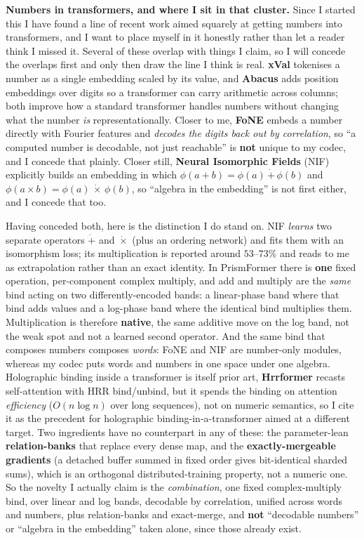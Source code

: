 \documentclass[11pt]{article}
\begin{document}
\textbf{Numbers in transformers, and where I sit in that cluster.} Since I started this I have found a
line of recent work aimed squarely at getting numbers into transformers, and I want to place myself in
it honestly rather than let a reader think I missed it. Several of these overlap with things I claim, so
I will concede the overlaps first and only then draw the line I think is real. \textbf{xVal}
\parencite{golkar2023xval} tokenises a number as a single embedding scaled by its value, and \textbf{Abacus}
\parencite{mcleish2024abacus} adds position embeddings over digits so a transformer can carry arithmetic
across columns; both improve how a standard transformer handles numbers without changing what the number
\emph{is} representationally. Closer to me, \textbf{FoNE} \parencite{zhou2025fone} embeds a number directly with
Fourier features and \emph{decodes the digits back out by correlation}, so ``a computed number is
decodable, not just reachable'' is \textbf{not} unique to my codec, and I concede that plainly. Closer
still, \textbf{Neural Isomorphic Fields} (NIF) \parencite{sadeghi2026nif} explicitly builds an embedding in
which $\phi(a+b)=\phi(a)\,\dot{+}\,\phi(b)$ and $\phi(a\times b)=\phi(a)\,\dot{\times}\,\phi(b)$, so
``algebra in the embedding'' is not first either, and I concede that too.

Having conceded both, here is the distinction I do stand on. NIF \emph{learns} two separate operators
$\dot{+}$ and $\dot{\times}$ (plus an ordering network) and fits them with an isomorphism loss; its
multiplication is reported around $53$--$73\%$ and reads to me as extrapolation rather than an exact
identity. In PrismFormer there is \textbf{one} fixed operation, per-component complex multiply, and add
and multiply are the \emph{same} bind acting on two differently-encoded bands: a linear-phase band where
that bind adds values and a log-phase band where the identical bind multiplies them. Multiplication is
therefore \textbf{native}, the same additive move on the log band, not the weak spot and not a learned
second operator. And the same bind that composes numbers composes \emph{words}: FoNE and NIF are
number-only modules, whereas my codec puts words and numbers in one space under one algebra. Holographic
binding inside a transformer is itself prior art, \textbf{Hrrformer} \parencite{alam2023hrrformer} recasts
self-attention with HRR bind/unbind, but it spends the binding on attention \emph{efficiency} ($O(n\log
n)$ over long sequences), not on numeric semantics, so I cite it as the precedent for holographic
binding-in-a-transformer aimed at a different target. Two ingredients have no counterpart in any of these:
the parameter-lean \textbf{relation-banks} that replace every dense map, and the
\textbf{exactly-mergeable gradients} (a detached buffer summed in fixed order gives bit-identical sharded
sums), which is an orthogonal distributed-training property, not a numeric one. So the novelty I actually
claim is the \emph{combination}, one fixed complex-multiply bind, over linear and log bands, decodable by
correlation, unified across words and numbers, plus relation-banks and exact-merge, and \textbf{not}
``decodable numbers'' or ``algebra in the embedding'' taken alone, since those already exist.
\end{document}
